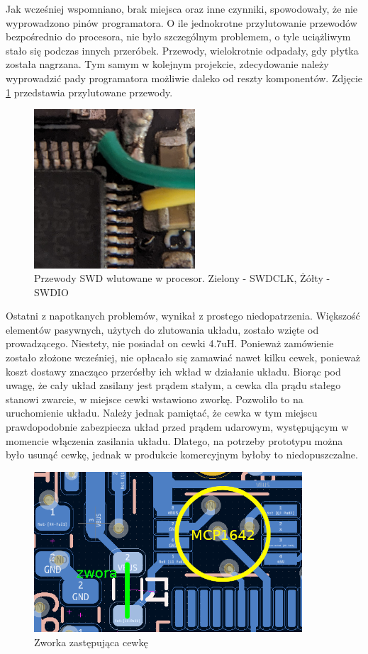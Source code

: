 Jak wcześniej wspomniano, brak miejsca oraz inne czynniki, spowodowały, że nie wyprowadzono pinów programatora. O ile jednokrotne przylutowanie przewodów bezpośrednio do procesora, nie było szczególnym problemem, o tyle uciążliwym stało się podczas innych przeróbek. Przewody, wielokrotnie odpadały, gdy płytka została nagrzana. Tym samym w kolejnym projekcie, zdecydowanie należy wyprowadzić pady programatora możliwie daleko od reszty komponentów. Zdjęcie \ref{img:fix_swd} przedstawia przylutowane przewody.

\begin{figure}[H]
    \centering
    \includegraphics[width=6cm]{Graphics/fix_swd.png}
    \caption{Przewody SWD wlutowane w procesor. Zielony - SWDCLK, Żółty - SWDIO}
    \label{img:fix_swd}
\end{figure}
Ostatni z napotkanych problemów, wynikał z prostego niedopatrzenia. Większość elementów pasywnych, użytych do zlutowania układu, zostało wzięte od prowadzącego. Niestety, nie posiadał on cewki 4.7uH. Ponieważ zamówienie zostało złożone wcześniej, nie opłacało się zamawiać nawet kilku cewek, ponieważ koszt dostawy znacząco przerósłby ich wkład w działanie układu. Biorąc pod uwagę, że cały układ zasilany jest prądem stałym, a cewka dla prądu stałego stanowi zwarcie, w miejsce cewki wstawiono zworkę. Pozwoliło to na uruchomienie układu. Należy jednak pamiętać, że cewka w tym miejscu prawdopodobnie zabezpiecza układ przed prądem udarowym, występującym w momencie włączenia zasilania układu. Dlatego, na potrzeby prototypu można było usunąć cewkę, jednak w produkcie komercyjnym byłoby to niedopuszczalne.
\begin{figure}[H]
    \centering
    \includegraphics[width=10cm]{Graphics/fix_inductor.png}
    \caption{Zworka zastępująca cewkę}
    \label{img:fix_inductor}
\end{figure}

